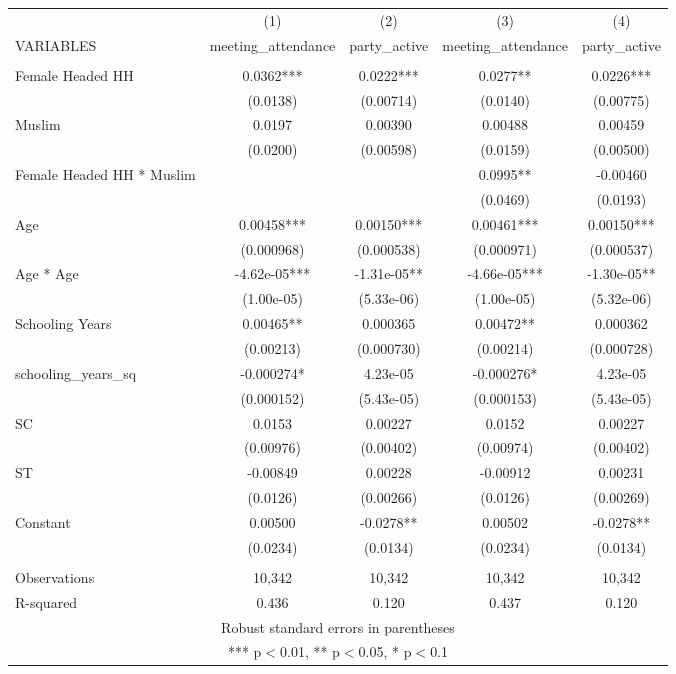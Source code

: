 \documentclass[]{article}
\begin{document}
\begin{tabular}{lcccc} \hline
 & (1) & (2) & (3) & (4) \\
VARIABLES & meeting\_attendance & party\_active & meeting\_attendance & party\_active \\ \hline
 &  &  &  &  \\
Female Headed HH & 0.0362*** & 0.0222*** & 0.0277** & 0.0226*** \\
 & (0.0138) & (0.00714) & (0.0140) & (0.00775) \\
Muslim & 0.0197 & 0.00390 & 0.00488 & 0.00459 \\
 & (0.0200) & (0.00598) & (0.0159) & (0.00500) \\
Female Headed HH * Muslim &  &  & 0.0995** & -0.00460 \\
 &  &  & (0.0469) & (0.0193) \\
Age & 0.00458*** & 0.00150*** & 0.00461*** & 0.00150*** \\
 & (0.000968) & (0.000538) & (0.000971) & (0.000537) \\
Age * Age & -4.62e-05*** & -1.31e-05** & -4.66e-05*** & -1.30e-05** \\
 & (1.00e-05) & (5.33e-06) & (1.00e-05) & (5.32e-06) \\
Schooling Years & 0.00465** & 0.000365 & 0.00472** & 0.000362 \\
 & (0.00213) & (0.000730) & (0.00214) & (0.000728) \\
schooling\_years\_sq & -0.000274* & 4.23e-05 & -0.000276* & 4.23e-05 \\
 & (0.000152) & (5.43e-05) & (0.000153) & (5.43e-05) \\
SC & 0.0153 & 0.00227 & 0.0152 & 0.00227 \\
 & (0.00976) & (0.00402) & (0.00974) & (0.00402) \\
ST & -0.00849 & 0.00228 & -0.00912 & 0.00231 \\
 & (0.0126) & (0.00266) & (0.0126) & (0.00269) \\
Constant & 0.00500 & -0.0278** & 0.00502 & -0.0278** \\
 & (0.0234) & (0.0134) & (0.0234) & (0.0134) \\
 &  &  &  &  \\
Observations & 10,342 & 10,342 & 10,342 & 10,342 \\
 R-squared & 0.436 & 0.120 & 0.437 & 0.120 \\ \hline
\multicolumn{5}{c}{ Robust standard errors in parentheses} \\
\multicolumn{5}{c}{ *** p$<$0.01, ** p$<$0.05, * p$<$0.1} \\
\end{tabular}
\end{document}
